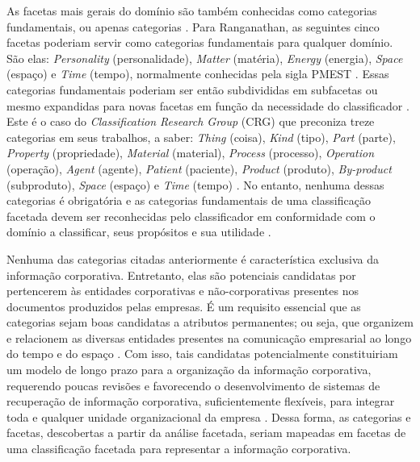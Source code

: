 As facetas mais gerais do domínio são também conhecidas como categorias fundamentais, ou apenas categorias \cite{spiteri98simplified}. Para Ranganathan, as seguintes cinco facetas poderiam servir como categorias fundamentais para qualquer domínio. São elas: \textit{Personality} (personalidade), \textit{Matter} (matéria), \textit{Energy} (energia), \textit{Space} (espaço) e \textit{Time} (tempo), normalmente conhecidas pela sigla PMEST \cite{garfield1984}. Essas categorias fundamentais poderiam ser então subdivididas em subfacetas ou mesmo expandidas para novas facetas em função da necessidade do classificador \cite{gopinath92}. Este é o caso do \textit{Classification Research Group} (CRG) que preconiza treze categorias em seus trabalhos, a saber: \textit{Thing} (coisa), \textit{Kind} (tipo), \textit{Part} (parte), \textit{Property} (propriedade), \textit{Material} (material), \textit{Process} (processo), \textit{Operation} (operação), \textit{Agent} (agente), \textit{Patient} (paciente), \textit{Product} (produto), \textit{By-product} (subproduto), \textit{Space} (espaço) e \textit{Time} (tempo) \cite{broughton2006}. No entanto, nenhuma dessas categorias é obrigatória e as categorias fundamentais de uma classificação facetada devem ser reconhecidas pelo classificador em conformidade com o domínio a classificar, seus propósitos e sua utilidade \cite{spiteri98simplified}.

Nenhuma das categorias citadas anteriormente é característica exclusiva da informação corporativa. Entretanto, elas são potenciais candidatas por pertencerem às entidades corporativas e não-corporativas presentes nos documentos produzidos pelas empresas. É um requisito essencial que as categorias sejam boas candidatas a atributos permanentes; ou seja, que organizem e relacionem as diversas entidades presentes na comunicação empresarial ao longo do tempo e do espaço \cite{labarre2010}. Com isso, tais candidatas potencialmente constituiriam um modelo de longo prazo para a organização da informação corporativa, requerendo poucas revisões e favorecendo o desenvolvimento de sistemas de recuperação de informação corporativa, suficientemente flexíveis, para integrar toda e qualquer unidade organizacional da empresa \cite{vakkari2005explanation}. Dessa forma, as categorias e facetas, descobertas a partir da análise facetada, seriam mapeadas em facetas de uma classificação facetada para representar a informação corporativa.

